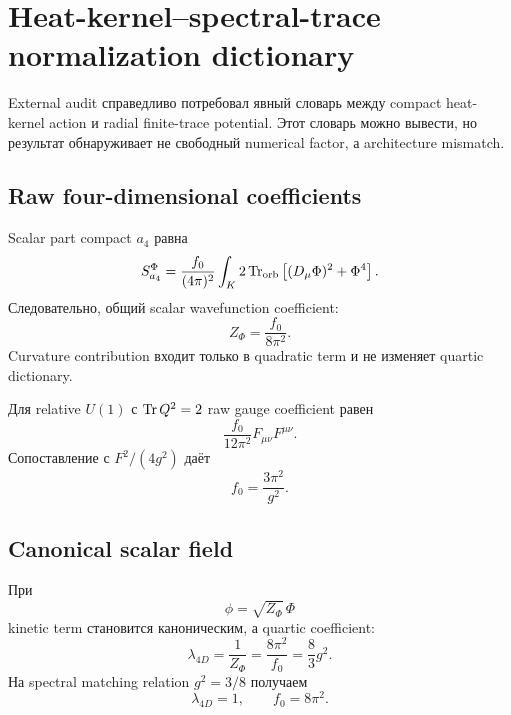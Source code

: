 \chapter{Heat-kernel--spectral-trace normalization dictionary}

External audit справедливо потребовал явный словарь между compact
heat-kernel action и radial finite-trace potential. Этот словарь можно
вывести, но результат обнаруживает не свободный numerical factor, а
architecture mismatch.

\section{Raw four-dimensional coefficients}

Scalar part compact $a_4$ равна
\begin{equation}
 S_{a_4}^{\Phi}
 =
 \frac{f_0}{(4\pi)^2}
 \int_K
 2\operatorname{Tr}_{\rm orb}
 \left[
 (D_\mu\Phi)^2+\Phi^4
 \right].
\end{equation}
Следовательно, общий scalar wavefunction coefficient:
\begin{equation}
 Z_\Phi=\frac{f_0}{8\pi^2}.
\end{equation}
Curvature contribution входит только в quadratic term и не изменяет
quartic dictionary.

Для relative $U(1)$ с $\operatorname{Tr} Q^2=2$ raw gauge coefficient равен
\begin{equation}
 \frac{f_0}{12\pi^2}F_{\mu\nu}F^{\mu\nu}.
\end{equation}
Сопоставление с $F^2/(4g^2)$ даёт
\begin{equation}
 f_0=\frac{3\pi^2}{g^2}.
\end{equation}

\section{Canonical scalar field}

При
\begin{equation}
 \phi=\sqrt{Z_\Phi}\,\Phi
\end{equation}
kinetic term становится каноническим, а quartic coefficient:
\begin{equation}
 \lambda_{4D}
 =\frac1{Z_\Phi}
 =\frac{8\pi^2}{f_0}
 =\frac83g^2.
\end{equation}
На spectral matching relation $g^2=3/8$ получаем
\begin{equation}
 \boxed{\lambda_{4D}=1},
 \qquad
 \boxed{f_0=8\pi^2}.
\end{equation}

